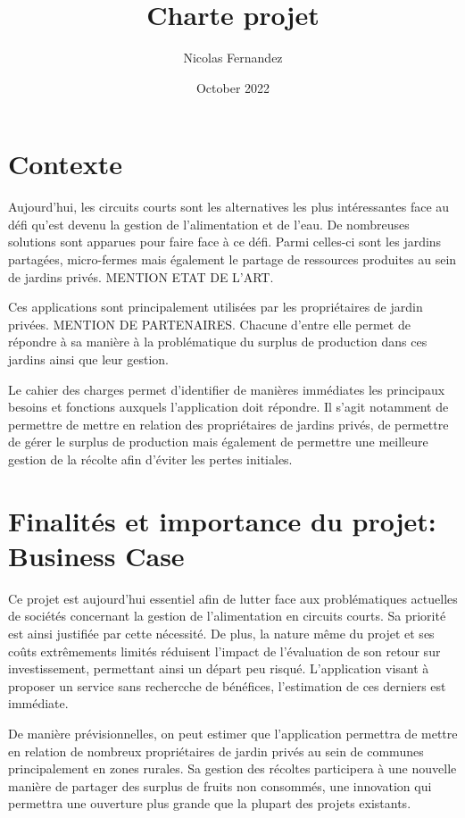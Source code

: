 \documentclass{article}
\title{Charte projet}
\author{Nicolas Fernandez}
\date{October 2022}
\begin{document}
\maketitle

\section{Contexte}

Aujourd'hui, les circuits courts sont les alternatives les plus intéressantes face au défi qu'est devenu la gestion de l'alimentation et de l'eau. De nombreuses solutions sont apparues pour faire face à ce défi. Parmi celles-ci sont les jardins partagées, micro-fermes mais également le partage de ressources produites au sein de jardins privés. MENTION ETAT DE L'ART.

Ces applications sont principalement utilisées par les propriétaires de jardin privées. MENTION DE PARTENAIRES. Chacune d'entre elle permet de répondre à sa manière à la problématique du surplus de production dans ces jardins ainsi que leur gestion.

Le cahier des charges permet d'identifier de manières immédiates les principaux besoins et fonctions auxquels l'application doit répondre. Il s'agit notamment de permettre de mettre en relation des propriétaires de jardins privés, de permettre de gérer le surplus de production mais également de permettre une meilleure gestion de la récolte afin d'éviter les pertes initiales.

\maketitle

\section{Finalités et importance du projet: Business Case}

Ce projet est aujourd'hui essentiel afin de lutter face aux problématiques actuelles de sociétés concernant la gestion de l'alimentation en circuits courts. Sa priorité est ainsi justifiée par cette nécessité. De plus, la nature même du projet et ses coûts extrêmements limités réduisent l'impact de l'évaluation de son retour sur investissement, permettant ainsi un départ peu risqué. L'application visant à proposer un service sans rechercche de bénéfices, l'estimation de ces derniers est immédiate.

De manière prévisionnelles, on peut estimer que l'application permettra de mettre en relation de nombreux propriétaires de jardin privés au sein de communes principalement en zones rurales. Sa gestion des récoltes participera à une nouvelle manière de partager des surplus de fruits non consommés, une innovation qui permettra une ouverture plus grande que la plupart des projets existants.
\end{document}
